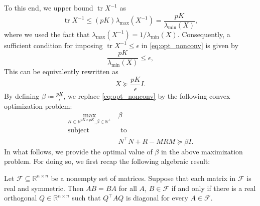 \documentclass{ifacconf}
\DeclareMathOperator{\tr}{tr}
\newcommand{\calF}{\ensuremath{\mathcal{F}}}
\newcommand{\R}{\ensuremath{\mathbb R}}
\newcommand{\lmin}{\ensuremath{\lambda}_{\textrm{min}}}
\newcommand{\lmax}{\ensuremath{\lambda}_{\textrm{max}}}
\def\be{\begin{equation}}
\def\ee{\end{equation}}
\newcommand{\+}{\mathsmaller{+}}
\begin{document}
%
%
%
%
%
%
%
%
%
%
%
%
%
%
%
%
%
%
%
%
%
%
%
%
%
%
%
%
%
To this end, we upper bound $\tr X^{-1}$  as 
\[
	 \tr X^{-1} \leq  (pK)\lmax(X^{-1}) = \frac{pK}{\lmin(X)},
\]
where we used the fact that $\lmax(X^{-1}) =1/\lmin(X)$. Consequently, a sufficient condition for imposing $\tr X^{-1} \leq \epsilon$ in   \eqref{eq:opt_nonconv} is  given by
\[
\frac{pK}{\lmin(X)} \leq \epsilon,
\]
%
 This can be equivalently rewritten as 
\[
X \succeq \frac{pK}{\epsilon} I.
\]
By defining $\beta \coloneqq \frac{pK}{\epsilon}$, we replace \eqref{eq:opt_nonconv} by the following convex optimization problem: 
%
\be\label{eq:main_optimization}
\begin{aligned}
	\max_{R \in \R^{pK \times pK}, \beta \in \R^+}  \,& \beta  \\
		\text{sub}\text{ject}& \,\, \text{to}  \\
	& N^{\top}N + R - MRM \succeq \beta I.
\end{aligned}
\ee
%
In what follows, we provide the optimal value of $\beta$ in the above maximization problem. 
%
%
%
%
%
%
%
%
For doing so, we first recap the following algebraic result:  
\begin{lem}\cite[p. 284]{garcia2017second}\label{lem:A_B_com_simul}
Let $\calF \subseteq \R^{n\times n}$ be a nonempty set of matrices. Suppose that each matrix in $\calF$ is real and symmetric. Then $AB = BA$ for all $A$, $B \in \calF$ if and only if there is a real orthogonal $Q \in \R^{n\times n}$ such that $Q^{\top}AQ$ is diagonal for every $A\in \calF$.
\end{lem}
\end{document}

